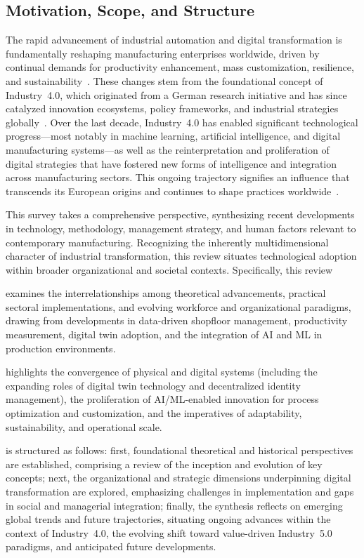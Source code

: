 \documentclass[sigconf]{acmart}
\begin{document}
\subsection{Motivation, Scope, and Structure}

The rapid advancement of industrial automation and digital transformation is fundamentally reshaping manufacturing enterprises worldwide, driven by continual demands for productivity enhancement, mass customization, resilience, and sustainability~\cite{ref50,ref54,ref62,ref63,ref67,ref86,ref91,ref92}. These changes stem from the foundational concept of Industry~4.0, which originated from a German research initiative and has since catalyzed innovation ecosystems, policy frameworks, and industrial strategies globally~\cite{ref24}. Over the last decade, Industry~4.0 has enabled significant technological progress—most notably in machine learning, artificial intelligence, and digital manufacturing systems—as well as the reinterpretation and proliferation of digital strategies that have fostered new forms of intelligence and integration across manufacturing sectors. This ongoing trajectory signifies an influence that transcends its European origins and continues to shape practices worldwide~\cite{ref24}.

This survey takes a comprehensive perspective, synthesizing recent developments in technology, methodology, management strategy, and human factors relevant to contemporary manufacturing. Recognizing the inherently multidimensional character of industrial transformation, this review situates technological adoption within broader organizational and societal contexts. Specifically, this review

examines the interrelationships among theoretical advancements, practical sectoral implementations, and evolving workforce and organizational paradigms, drawing from developments in data-driven shopfloor management, productivity measurement, digital twin adoption, and the integration of AI and ML in production environments.

highlights the convergence of physical and digital systems (including the expanding roles of digital twin technology and decentralized identity management), the proliferation of AI/ML-enabled innovation for process optimization and customization, and the imperatives of adaptability, sustainability, and operational scale.

is structured as follows: first, foundational theoretical and historical perspectives are established, comprising a review of the inception and evolution of key concepts; next, the organizational and strategic dimensions underpinning digital transformation are explored, emphasizing challenges in implementation and gaps in social and managerial integration; finally, the synthesis reflects on emerging global trends and future trajectories, situating ongoing advances within the context of Industry~4.0, the evolving shift toward value-driven Industry~5.0 paradigms, and anticipated future developments.
\end{document}
